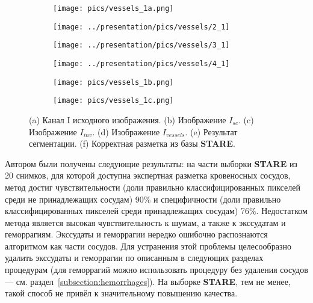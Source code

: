\documentclass[12pt,fleqn]{article}
\begin{document}
\begin{figure}[t]
	\centering
	\begin{subfigure}[b]{.31\textwidth}
		\texttt{[image: pics/vessels\_1a.png]}
		\caption{}
		\label{fig:vessels_1a}
	\end{subfigure}
	\hfill
	\begin{subfigure}[b]{.31\textwidth}
		\texttt{[image: ../presentation/pics/vessels/2\_1]}
		\caption{}
		\label{fig:2_1}
	\end{subfigure}
	\hfill
	\begin{subfigure}[b]{.31\textwidth}
		\texttt{[image: ../presentation/pics/vessels/3\_1]}
		\caption{}
		\label{fig:vessels3_1}
	\end{subfigure}
	
	\begin{subfigure}[b]{.31\textwidth}
		\centering
		\texttt{[image: ../presentation/pics/vessels/4\_1]}
		\caption{}
		\label{fig:vessels4_1}
	\end{subfigure}
	\hfill
	\begin{subfigure}[b]{.31\textwidth}
		\texttt{[image: pics/vessels\_1b.png]}
		\caption{}
		\label{fig:vessels_1b}
	\end{subfigure}
	\hfill
	\begin{subfigure}[b]{.31\textwidth}
		\texttt{[image: pics/vessels\_1c.png]}
		\caption{}
		\label{fig:vessels_1c}
	\end{subfigure}
	
	
	\caption{(a) Канал I исходного изображения. (b) Изображение $I_{sc}$. (c) Изображение $I_{inv}$. (d) Изображение $I_{vessels}$. (e) Результат сегментации. (f) Корректная разметка из базы \textbf{STARE}.}
	\label{fig:vessels_1}
\end{figure}

Автором были получены следующие результаты: на части выборки \textbf{STARE} из 20 снимков, для которой доступна экспертная разметка кровеносных сосудов, метод достиг чувствительности (доли правильно классифицированных пикселей среди не принадлежащих сосудам) 90\% и специфичности (доли правильно классифицированных пикселей среди принадлежащих сосудам) 76\%. Недостатком метода является высокая чувствительность к шумам, а также к экссудатам и геморрагиям. Экссудаты и геморрагии нередко ошибочно распознаются алгоритмом как части сосудов. Для устранения этой проблемы целесообразно удалить экссудаты и геморрагии по описанным в следующих разделах процедурам (для геморрагий можно использовать процедуру без удаления сосудов --- см. раздел~\ref{subsection:hemorrhages}). На выборке \textbf{STARE}, тем не менее, такой способ не привёл к значительному повышению качества.
\end{document}
